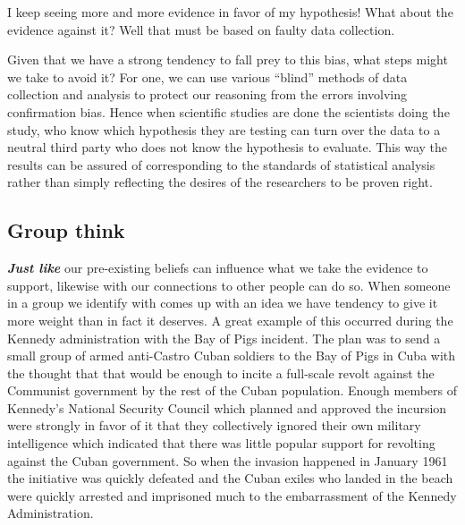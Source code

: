 \documentclass[12pt, openany]{book}
\begin{document}
\begin{center}

\begin{argument}

I keep seeing more and more evidence in favor of my hypothesis! What about the evidence against it? Well that must be based on faulty data collection.

\end{argument}

\end{center}

Given that we have a strong tendency to fall prey to this bias, what steps might we take to avoid it? For one, we can use various ``blind'' methods of data collection and analysis to protect our reasoning from the errors involving confirmation bias. Hence when scientific studies are done the scientists doing the study, who know which hypothesis they are testing can turn over the data to a neutral third party who does not know the hypothesis to evaluate. This way the results can be assured of corresponding to the standards of statistical analysis rather than simply reflecting the desires of the researchers to be proven right.

\hypertarget{group-think}{%
\subsection*{Group think}\label{group-think}}


\textbf{\emph{Just like}} our pre-existing beliefs can influence what we take the evidence to support, likewise with our connections to other people can do so. When someone in a group we identify with comes up with an idea we have tendency to give it more weight than in fact it deserves. A great example of this occurred during the Kennedy administration with the Bay of Pigs incident. The plan was to send a small group of armed anti-Castro Cuban soldiers to the Bay of Pigs in Cuba with the thought that that would be enough to incite a full-scale revolt against the Communist government by the rest of the Cuban population. Enough members of Kennedy's National Security Council which planned and approved the incursion were strongly in favor of it that they collectively ignored their own military intelligence which indicated that there was little popular support for revolting against the Cuban government. So when the invasion happened in January 1961 the initiative was quickly defeated and the Cuban exiles who landed in the beach were quickly arrested and imprisoned much to the embarrassment of the Kennedy Administration.\citep{BayPigsGroupthink}
\end{document}
